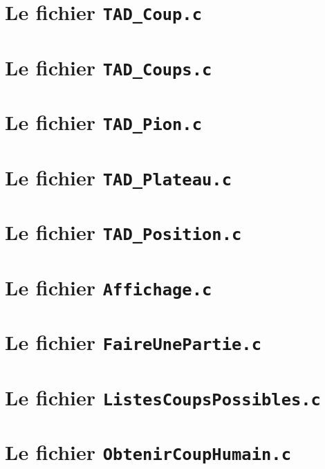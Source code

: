 \section{Le fichier \tt{TAD\_Coup.c}}


\section{Le fichier \tt{TAD\_Coups.c}}


\section{Le fichier \tt{TAD\_Pion.c}}


\section{Le fichier \tt{TAD\_Plateau.c}}


\section{Le fichier \tt{TAD\_Position.c}}


\section{Le fichier \tt{Affichage.c}}


\section{Le fichier \tt{FaireUnePartie.c}}


\section{Le fichier \tt{ListesCoupsPossibles.c}}


\section{Le fichier \tt{ObtenirCoupHumain.c}}


